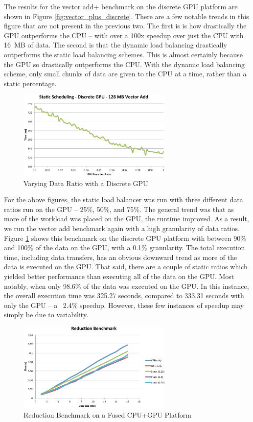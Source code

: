 \documentclass[journal]{IEEEtran}
\begin{document}
The results for the vector add+ benchmark on the discrete GPU platform are shown in Figure
\ref{fig:vector_plus_discrete}.  There are a few notable trends in this figure that are not
present in the previous two.  The first is is how drastically the GPU outperforms the CPU --
with over a 100x speedup over just the CPU with 16~MB of data.  The second is that the
dynamic load balancing drastically outperforms the static load balancing schemes.  This is
almost certainly because the GPU so drastically outperforms the CPU.  With the dynamic load
balancing scheme, only small chunks of data are given to the CPU at a time, rather than a
static percentage.

\begin{figure}[t]
\centering
\includegraphics[width=3.0in]{static_discrete}
\caption{Varying Data Ratio with a Discrete GPU}
\label{fig:static_discrete}
\end{figure}

For the above figures, the static load balancer was run with three different
data ratios run on the GPU -- 25\%, 50\%, and 75\%.  The general trend was that
as more of the workload was placed on the GPU, the runtime improved.  As a
result, we run the vector add benchmark again with a high granularity of data
ratios.  Figure \ref{fig:static_discrete} shows  this benchmark on the discrete
GPU platform with between 90\% and 100\% of the data on the GPU, with a 0.1\%
granularity.  The total execution time, including data transfers, has an
obvious downward trend as more of the data is executed on the GPU.  That said,
there are a couple of static ratios which yielded better performance than
executing all of the data on the GPU.  Most notably, when only 98.6\% of the
data was executed on the GPU.  In this instance, the overall execution time was
325.27 seconds, compared to 333.31 seconds with only the GPU -- a ~2.4\%
speedup.  However, these few instances of speedup may simply be due to variability.

\begin{figure}[t]
\centering
\includegraphics[width=3.0in]{reduce_fused}
\caption{Reduction Benchmark on a Fused CPU+GPU Platform}
\label{fig:reduce_fused}
\end{figure}
\end{document}
